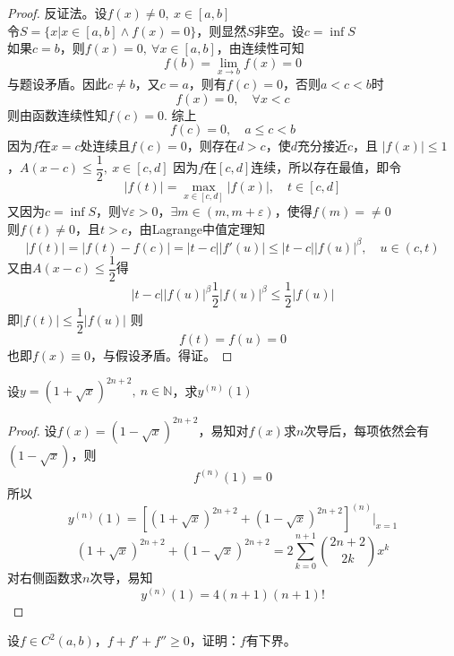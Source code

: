 \begin{proof}

    反证法。设$f(x) \neq 0,\ x \in [a,b]$\\
    令$S = \{x | x \in [a,b] \land f(x) = 0\}$，则显然$S$非空。设$ c = \inf{S}$\\
    如果$c= b$，则$f(x) = 0, \ \forall x \in [a,b]$，由连续性可知
    $$f(b) = \lim\limits_{x\to b}{f(x)} = 0$$
    与题设矛盾。因此$c \neq b$，又$c =a $，则有$f(c) = 0$，否则$a<c<b$时
    $$f(x) = 0, \quad \forall x < c$$
    则由函数连续性知$f(c) = 0$. 综上
    $$f(c) = 0, \quad a \leq c < b$$
    因为$f$在$x = c$处连续且$f(c) = 0$，则存在$d > c$，使$d$充分接近$c$，且
    $|f(x)| \leq 1$，$A(x - c) \leq \dfrac{1}{2}, \ x \in [c,d]$
    因为$f$在$[c,d]$连续，所以存在最值，即令
    $$ |f(t)| = \max_{x\in[c,d]}{|f(x)|}, \quad t \in [c,d]$$
    又因为$c = \inf{S}$，则$\forall \varepsilon > 0$，$\exists m \in (m, m+\varepsilon)$，使得$f(m) = \neq 0$\\
    则$f(t) \neq 0$，且$t > c$，由\textup{Lagrange}中值定理知
    $$| f(t)| = |f(t) - f(c)| = |t-c||f'(u)| \leq |t-c||f(u)|^{\beta}, \quad u \in (c,t)$$
    又由$A(x-c) \leq \dfrac{1}{2}$得
    $$|t-c||f(u)|^{\beta} \dfrac{1}{2}|f(u)|^{\beta} \leq \dfrac{1}{2} |f(u)|$$
    即$|f(t)| \leq \dfrac{1}{2}|f(u)|$
    则
    $$f(t) = f(u) = 0$$
    也即$f(x) \equiv 0$，与假设矛盾。得证。

\end{proof}

\begin{proposition}
    
    设$y = (1 + \sqrt{x})^{2n+2},\ n \in \mathbb{N}$，求$y^{(n)}(1)$

\end{proposition}

\begin{proof}

    设$f(x) = (1 - \sqrt{x})^{2n+2}$，易知对$f(x)$求$n$次导后，每项依然会有$(1 - \sqrt{x})$，则
    $$f^{(n)}(1) = 0$$
    所以
    $$y^{(n)}(1) = \left[(1 + \sqrt{x})^{2n+2} + (1 - \sqrt{x})^{2n+2}\right]^{(n)}\Big|_{x=1}$$
    $$ (1 + \sqrt{x})^{2n+2} + (1 - \sqrt{x})^{2n+2} = 2 \sum\limits_{k=0}^{n+1}{\binom{2n+2}{2k}x^k}$$
    对右侧函数求$n$次导，易知
    $$y^{(n)}(1) = 4(n+1)(n+1)!$$

\end{proof}

\begin{proposition}
    
    设$f \in C^2(a,b)$，$f + f' + f'' \geq 0$，证明：$f$有下界。

\end{proposition}

